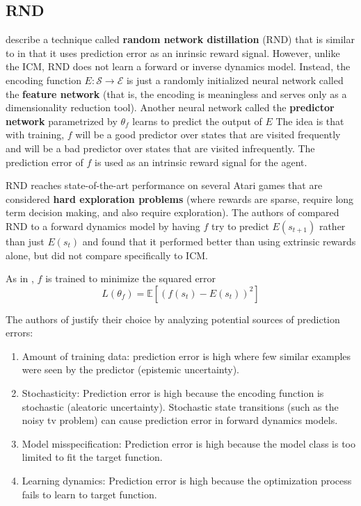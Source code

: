 \documentclass[journal, onecolumn, 12pt, draftclsnofoot]{IEEEtran}
\newcommand{\kword}[1]{\textbf{#1}}
\newcommand{\mc}[1]{\mathcal{#1}}
\begin{document}
	\subsection{RND}
	\par \cite{rnd} describe a technique called \kword{random network distillation} (RND) that is similar to \cite{icm} in that it uses prediction error as an inrinsic reward signal. However, unlike the ICM, RND does not learn a forward or inverse dynamics model. Instead, the encoding function $E:\mc{S} \to \mc{E}$ is just a randomly initialized neural network called the \kword{feature network} (that is, the encoding is meaningless and serves only as a dimensionality reduction tool). Another neural network called the \kword{predictor network} parametrized by $\theta_f$ learns to predict the output of $E$ The idea is that with training, $f$ will be a good predictor over states that are visited frequently and will be a bad predictor over states that are visited infrequently. The prediction error of $f$ is used as an intrinsic reward signal for the agent.
	\par RND reaches state-of-the-art performance on several Atari games that are considered \kword{hard exploration problems} (where rewards are sparse, require long term decision making, and also require exploration). The authors of \cite{rnd} compared RND to a forward dynamics model by having $f$ try to predict $E(s_{t+1})$ rather than just $E(s_t)$ and found that it performed better than using extrinsic rewards alone, but did not compare specifically to ICM.
	\par As in \cite{icm}, $f$ is trained to minimize the squared error
	\begin{equation}
		\label{eqn:rnd-loss}
		L(\theta_f) = \mathbb{E} \left[\left(f(s_t) - E(s_t) \right)^2 \right]
	\end{equation}
	\par The authors of \cite{rnd} justify their choice by analyzing potential sources of prediction errors:
	\begin{enumerate}
		\item Amount of training data: prediction error is high where few similar examples were seen by the predictor (epistemic uncertainty).
		\item Stochasticity: Prediction error is high because the encoding function is stochastic (aleatoric uncertainty). Stochastic state transitions (such as the noisy tv problem) can cause prediction error in forward dynamics models.
		\item Model misspecification: Prediction error is high because the model class is too limited to fit the target function.
		\item Learning dynamics: Prediction error is high because the optimization process fails to learn to target function.
	\end{enumerate}
\end{document}
